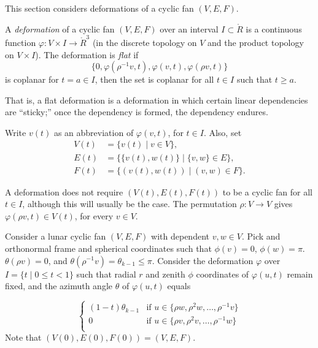 This section considers deformations of a cyclic fan $(V,E,F)$.

\begin{definition}
A {\it deformation} of a cyclic fan $(V,E,F)$ over an interval $I\subset\ring{R}$
is a 
continuous function $\varphi:V\times I \to\ring{R}^3$ (in the discrete topology on $V$ and the product topology on $V\times I$).
The deformation is {\it flat} if 
$$\{0,\varphi(\rho^{-1}v,t),\varphi(v,t),\varphi(\rho v,t)\}$$
is coplanar for $t=a\in I$, then the set is coplanar for all $t\in I$ such
that $t\ge a$.
\end{definition}

That is, a flat deformation is a deformation in which certain linear
dependencies are ``sticky;''  once the dependency is formed, the dependency endures.

Write $v(t)$ as an abbreviation of $\varphi(v,t)$, for $t\in I$.  
Also, set
$$
\begin{array}{lll}
V(t)&=\{v(t) \mid v\in V\},\\
E(t)&=\{\{v(t),w(t)\}\mid \{v,w\}\in E\},\\
F(t)&= \{(v(t),w(t)) \mid  (v,w)\in F\}.
\end{array}
$$


A deformation does not require $(V(t),E(t),F(t))$ to be a cyclic fan for all $t\in I$, although this will usually be the case. The permutation $\rho:V\to V$ gives $\varphi(\rho v,t)\in V(t)$, for every $v\in V$.  


\begin{example}
Consider a lunar cyclic fan $(V,E,F)$ with dependent $v,w\in V$.   Pick and orthonormal frame and spherical coordinates such that $\phi(v)=0$, $\phi(w)=\pi$.  $\theta(\rho v)=0$, and $\theta(\rho^{-1} v)=\theta_{k-1}\le\pi$.  Consider the deformation $\varphi$ over 
$I = \{t \mid 0 \le t < 1\}$
such that radial $r$ and zenith $\phi$ coordinates of $\varphi(u,t)$ remain fixed,
and the azimuth angle $\theta$ of $\varphi(u,t)$ equals

$$
\begin{cases} 
   (1-t) \theta_{k-1} & \text{if } u\in \{\rho w,\rho^2 w,\ldots, \rho^{-1} v\}\\
   0 & \text{if } u\in \{\rho v,\rho^2 v,\ldots,\rho^{-1} w\}\\
\end{cases}
$$
Note that $(V(0),E(0),F(0)) = (V,E,F)$.
\end{example}

